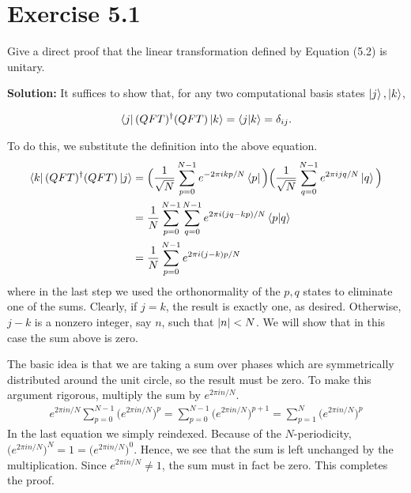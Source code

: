 \documentclass{book}
\begin{document}
\section*{Exercise 5.1}
    Give a direct proof that the linear transformation defined by Equation (5.2) is unitary.
    
    \textbf{Solution:} It suffices to show that, for any two computational basis states $\ket{j}, \ket{k}$,
    
    \begin{align} \label{eq:5.1:QFT_unitary}
        \bra{j}(QFT)^\dagger(QFT)\ket{k} = \braket{j}{k} = \delta_{ij}.
    \end{align}
    
    To do this, we substitute the definition into the above equation. 
    \begin{align} \label{eq:5.1:expand_and_simplify}
    \begin{aligned}
        \bra{k}(QFT)^\dagger(QFT)\ket{j} &= \Big(\frac{1}{\sqrt{N}}\sum_{p=0}^{N-1}e^{-2\pi ikp/N}\bra{p}\Big)\Big(\frac{1}{\sqrt{N}}\sum_{q=0}^{N-1}e^{2\pi ijq/N}\ket{q}\Big) \\
        &= \frac{1}{N}\sum_{p=0}^{N-1}\sum_{q=0}^{N-1}e^{2\pi i(jq-kp)/N}\braket{p}{q} \\
        &= \frac{1}{N}\sum_{p=0}^{N-1} e^{2\pi i (j-k)p/N}
    \end{aligned}
    \end{align}
    where in the last step we used the orthonormality of the $p,q$ states to eliminate one of the sums. Clearly, if $j=k$, the result is exactly one, as desired. Otherwise, $j-k$ is a nonzero integer, say $n$, such that $\abs{n}<N$. We will show that in this case the sum above is zero. 
    
    The basic idea is that we are taking a sum over phases which are symmetrically distributed around the unit circle, so the result must be zero. To make this argument rigorous, multiply the sum by $e^{2\pi i n/N}$.
    \begin{align}
        e^{2\pi i n/N}\sum_{p=0}^{N-1}\big(e^{2\pi i n/N}\big)^p = \sum_{p=0}^{N-1}\big(e^{2\pi i n/N}\big)^{p+1} = \sum_{p=1}^{N}\big(e^{2\pi i n/N}\big)^{p}
    \end{align}
    In the last equation we simply reindexed. Because of the $N$-periodicity, $\big(e^{2\pi i n/N}\big)^N = 1 = \big(e^{2\pi i n/N}\big)^0$. Hence, we see that the sum is left unchanged by the multiplication. Since $e^{2\pi i n/N} \neq 1$, the sum must in fact be zero. This completes the proof.
\end{document}
